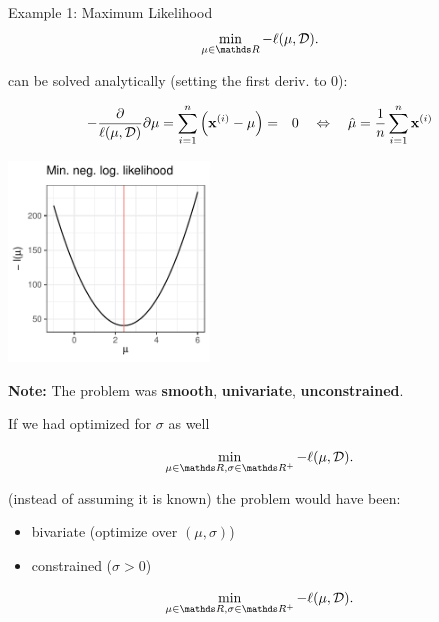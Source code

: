 \begin{vbframe}{Example 1: Maximum Likelihood}
$$
	\min_{\mu \in \R} - \ell(\mu, \D).
$$

can be solved analytically (setting the first deriv. to $0$):
\vspace*{-0.5cm}

\begin{footnotesize}
\begin{eqnarray*}
	-\frac{\partial}{\ell(\mu, \mathcal{D})}{\partial \mu} = \sum\limits_{i=1}^n \left(\mathbf{x}^{(i)} - \mu\right) &=& 0 \quad \Leftrightarrow \quad \hat \mu = \frac{1}{n} \sum\limits_{i=1}^n \mathbf{x}^{(i)} 
\end{eqnarray*}
\end{footnotesize}

\vspace*{-0.4cm}

\begin{center}
	\begin{footnotesize}
	\includegraphics[width=0.4\textwidth, keepaspectratio]{figure_man/ml_normal_example_negloglike.pdf} 
	\end{footnotesize}
\end{center}

\framebreak 

\textbf{Note: } The problem was \textbf{smooth}, \textbf{univariate}, \textbf{unconstrained}. 

\lz 

If we had optimized for $\sigma$ as well 

$$
	\min_{\mu \in \R, \sigma \in \R^+} - \ell(\mu, \D).
$$


(instead of assuming it is known) the problem would have been: 

\begin{itemize}
	\item bivariate (optimize over $(\mu, \sigma)$)
	\item constrained ($\sigma > 0$)
\end{itemize}

$$
	\min_{\mu \in \R, \sigma \in \R^+} - \ell(\mu, \D).
$$

\end{vbframe}


